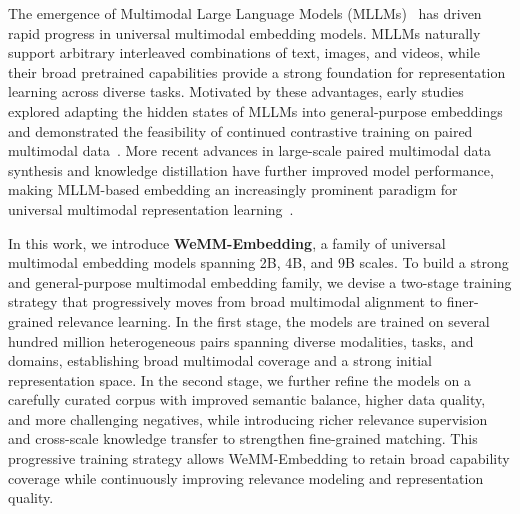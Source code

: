\documentclass[]{wechat}
\begin{document}
The emergence of Multimodal Large Language Models (MLLMs)~\citep{gpt4,llava-liu2023visual,internvl2} has driven rapid progress in universal multimodal embedding models. MLLMs naturally support arbitrary interleaved combinations of text, images, and videos, while their broad pretrained capabilities provide a strong foundation for representation learning across diverse tasks. Motivated by these advantages, early studies explored adapting the hidden states of MLLMs into general-purpose embeddings and demonstrated the feasibility of continued contrastive training on paired multimodal data~\citep{nv-mm-embed2024,vlm2vec2024}. More recent advances in large-scale paired multimodal data synthesis and knowledge distillation have further improved model performance, making MLLM-based embedding an increasingly prominent paradigm for universal multimodal representation learning~\citep{zhang2024gme,zhou2025megapairs,chen2025mme5,qwen3vl-emb}.


In this work, we introduce \textbf{WeMM-Embedding}, a family of universal multimodal embedding models spanning 2B, 4B, and 9B scales. To build a strong and general-purpose multimodal embedding family, we devise a two-stage training strategy that progressively moves from broad multimodal alignment to finer-grained relevance learning. In the first stage, the models are trained on several hundred million heterogeneous pairs spanning diverse modalities, tasks, and domains, establishing broad multimodal coverage and a strong initial representation space. In the second stage, we further refine the models on a carefully curated corpus with improved semantic balance, higher data quality, and more challenging negatives, while introducing richer relevance supervision and cross-scale knowledge transfer to strengthen fine-grained matching. This progressive training strategy allows WeMM-Embedding to retain broad capability coverage while continuously improving relevance modeling and representation quality.
\end{document}
